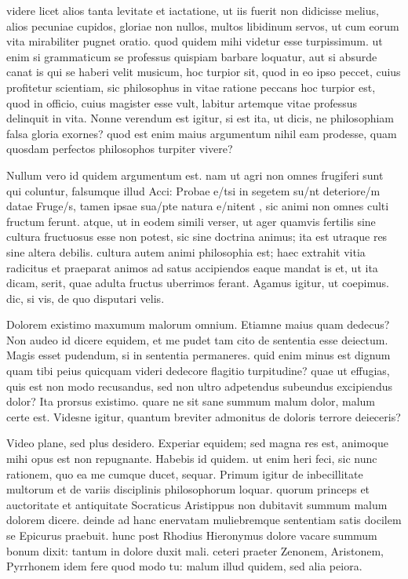  videre licet alios tanta levitate et iactatione, ut iis fuerit non didicisse melius, alios pecuniae cupidos, gloriae non nullos, multos libidinum servos, ut cum eorum vita mirabiliter pugnet oratio. quod quidem mihi videtur esse turpissimum. ut enim si grammaticum se professus quispiam barbare loquatur, aut si absurde canat is qui se haberi velit musicum, hoc turpior sit, quod in eo ipso peccet, cuius profitetur scientiam, sic philosophus in vitae ratione peccans hoc turpior est, quod in officio, cuius magister esse vult, labitur artemque vitae professus delinquit in vita. Nonne verendum est igitur, si est ita, ut dicis, ne philosophiam falsa gloria exornes? quod est enim maius argumentum nihil eam prodesse, quam quosdam perfectos philosophos turpiter vivere?

 Nullum vero id quidem argumentum est. nam ut agri non omnes frugiferi sunt qui coluntur, falsumque illud Acci: Probae e/tsi in segetem su/nt deteriore/m datae Fruge/s, tamen ipsae sua/pte natura e/nitent , sic animi non omnes culti fructum ferunt. atque, ut in eodem simili verser, ut ager quamvis fertilis sine cultura fructuosus esse non potest, sic sine doctrina animus; ita est utraque res sine altera debilis. cultura autem animi philosophia est; haec extrahit vitia radicitus et praeparat animos ad satus accipiendos eaque mandat is et, ut ita dicam, serit, quae adulta fructus uberrimos ferant. Agamus igitur, ut coepimus. dic, si vis, de quo disputari velis.

 Dolorem existimo maxumum malorum omnium. Etiamne maius quam dedecus? Non audeo id dicere equidem, et me pudet tam cito de sententia esse deiectum. Magis esset pudendum, si in sententia permaneres. quid enim minus est dignum quam tibi peius quicquam videri dedecore flagitio turpitudine? quae ut effugias, quis est non modo recusandus, sed non ultro adpetendus subeundus excipiendus dolor? Ita prorsus existimo. quare ne sit sane summum malum dolor, malum certe est. Videsne igitur, quantum breviter admonitus de doloris terrore deieceris?

 Video plane, sed plus desidero. Experiar equidem; sed magna res est, animoque mihi opus est non repugnante. Habebis id quidem. ut enim heri feci, sic nunc rationem, quo ea me cumque ducet, sequar. Primum igitur de inbecillitate multorum et de variis disciplinis philosophorum loquar. quorum princeps et auctoritate et antiquitate Socraticus Aristippus non dubitavit summum malum dolorem dicere. deinde ad hanc enervatam muliebremque sententiam satis docilem se Epicurus praebuit. hunc post Rhodius Hieronymus dolore vacare summum bonum dixit: tantum in dolore duxit mali. ceteri praeter Zenonem, Aristonem, Pyrrhonem idem fere quod modo tu: malum illud quidem, sed alia peiora.

